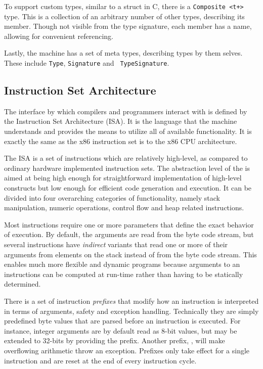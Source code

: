 
To support custom types, similar to a struct in C, there is a {\tt Composite
  <t+>} type. This is a collection of an arbitrary number of other types,
describing its member. Though not visible from the type signature, each member
has a name, allowing for convenient referencing.

Lastly, the machine has a set of meta types, describing types by them
selves. These include {\tt Type}, {\tt Signature} and {\tt
  TypeSignature}. %

\subsection{Instruction Set Architecture}
\label{sec:design:isa}

The interface by which compilers and programmers interact with \thename{} is
defined by the Instruction Set Architecture (ISA). It is the language that the
machine understands and provides the means to utilize all of available
functionality. It is exactly the same as the x86 instruction set is to the x86
CPU architecture.

The \thename{} ISA is a set of instructions which are relatively high-level, as
compared to ordinary hardware implemented instruction sets. The abstraction
level of the \thename{} is aimed at being high enough for straightforward
implementation of high-level constructs but low enough for efficient code
generation and execution. It can be divided into four overarching categories of
functionality, namely stack manipulation, numeric operations, control flow and
heap related instructions.

Most instructions require one or more parameters that define the exact behavior
of execution. By default, the arguments are read from the byte code stream, but
several instructions have \emph{indirect} variants that read one or more of
their arguments from elements on the stack instead of from the byte code
stream. This enables much more flexible and dynamic programs because arguments
to an instructions can be computed at run-time rather than having to be
statically determined.

There is a set of instruction \emph{prefixes} that modify how an instruction is
interpreted in terms of arguments, safety and exception handling. Technically
they are simply predefined byte values that are parsed before an instruction is
executed. For instance, integer arguments are by default read as 8-bit values,
but may be extended to 32-bits by providing the  prefix. Another
prefix, , will make overflowing arithmetic throw an
exception. Prefixes only take effect for a single instruction and are reset at
the end of every instruction cycle.

